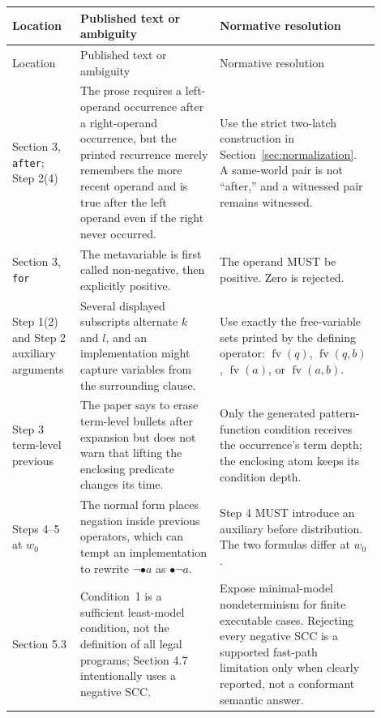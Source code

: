 \documentclass[11pt]{article}
\newcommand{\prev}{\mathbin{\bullet}}
\newcommand{\FV}{\operatorname{fv}}
\begin{document}
\begin{longtable}{>{\raggedright\arraybackslash}p{0.17\linewidth}
                  >{\raggedright\arraybackslash}p{0.35\linewidth}
                  >{\raggedright\arraybackslash}p{0.38\linewidth}}
\toprule
Location & Published text or ambiguity & Normative resolution \\
\midrule
\endfirsthead
\toprule
Location & Published text or ambiguity & Normative resolution \\
\midrule
\endhead
Section 3, \verb|after|; Step 2(4) &
The prose requires a left-operand occurrence after a right-operand occurrence,
but the printed recurrence merely remembers the more recent operand and is
true after the left operand even if the right never occurred. &
Use the strict two-latch construction in Section~\ref{sec:normalization}.  A
same-world pair is not ``after,'' and a witnessed pair remains witnessed. \\

Section 3, \verb|for| &
The metavariable is first called non-negative, then explicitly positive. &
The operand MUST be positive.  Zero is rejected. \\

Step 1(2) and Step 2 auxiliary arguments &
Several displayed subscripts alternate $k$ and $l$, and an implementation
might capture variables from the surrounding clause. &
Use exactly the free-variable sets printed by the defining operator:
$\FV(q)$, $\FV(q,b)$, $\FV(a)$, or $\FV(a,b)$. \\

Step 3 term-level previous &
The paper says to erase term-level bullets after expansion but does not warn
that lifting the enclosing predicate changes its time. &
Only the generated pattern-function condition receives the occurrence's term
depth; the enclosing atom keeps its condition depth. \\

Steps 4--5 at $w_0$ &
The normal form places negation inside previous operators, which can tempt an
implementation to rewrite $\neg\prev a$ as $\prev\neg a$. &
Step 4 MUST introduce an auxiliary before distribution.  The two formulas
differ at $w_0$. \\

Section 5.3 &
Condition~1 is a sufficient least-model condition, not the definition of all
legal programs; Section 4.7 intentionally uses a negative SCC. &
Expose minimal-model nondeterminism for finite executable cases.  Rejecting
every negative SCC is a supported fast-path limitation only when clearly
reported, not a conformant semantic answer. \\


\end{longtable}
\end{document}
